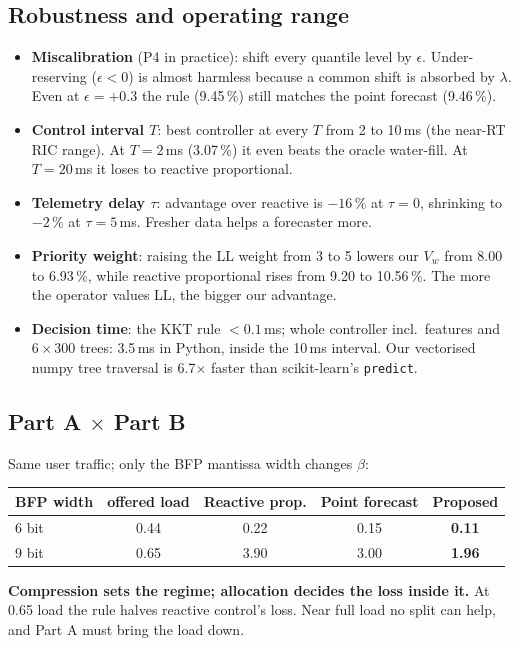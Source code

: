 \documentclass[11pt,a4paper]{article}
\begin{document}
\subsection{Robustness and operating range}

\begin{itemize}
  \item \textbf{Miscalibration} (P4 in practice): shift every quantile level by $\epsilon$. Under-reserving ($\epsilon < 0$) is almost harmless because a common shift is absorbed by $\lambda$. Even at $\epsilon = +0.3$ the rule (9.45\,\%) still matches the point forecast (9.46\,\%).
  \item \textbf{Control interval $T$}: best controller at every $T$ from 2 to 10\,ms (the near-RT RIC range). At $T = 2$\,ms (3.07\,\%) it even beats the oracle water-fill. At $T = 20$\,ms it loses to reactive proportional.
  \item \textbf{Telemetry delay $\tau$}: advantage over reactive is $-16\,\%$ at $\tau = 0$, shrinking to $-2\,\%$ at $\tau = 5$\,ms. Fresher data helps a forecaster more.
  \item \textbf{Priority weight}: raising the LL weight from 3 to 5 lowers our $V_w$ from 8.00 to 6.93\,\%, while reactive proportional rises from 9.20 to 10.56\,\%. The more the operator values LL, the bigger our advantage.
  \item \textbf{Decision time}: the KKT rule $<0.1$\,ms; whole controller incl.\ features and $6\times300$ trees: 3.5\,ms in Python, inside the 10\,ms interval. Our vectorised numpy tree traversal is 6.7$\times$ faster than scikit-learn's \texttt{predict}.
\end{itemize}

\subsection{Part A $\times$ Part B}

Same user traffic; only the BFP mantissa width changes $\beta$:
\begin{center}
\begin{tabular}{lcccc}
\toprule
BFP width & offered load & Reactive prop. & Point forecast & \textbf{Proposed} \\
\midrule
6 bit & 0.44 & 0.22 & 0.15 & \textbf{0.11} \\
9 bit & 0.65 & 3.90 & 3.00 & \textbf{1.96} \\
\bottomrule
\end{tabular}
\end{center}
\textbf{Compression sets the regime; allocation decides the loss inside it.} At 0.65 load the rule halves reactive control's loss. Near full load no split can help, and Part A must bring the load down.
\end{document}
